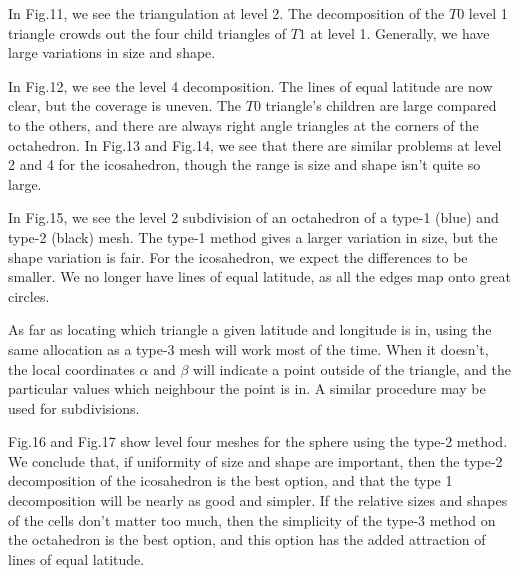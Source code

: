 \documentclass[12pt]{article}
\begin{document}
 In Fig.11, we see the triangulation
at level 2. The decomposition of the $T0$ level 1 triangle crowds out
the four child triangles of $T1$ at level 1. Generally, we have
large variations in size and shape.

In Fig.12, we see the level 4 decomposition. The lines of equal latitude
are now clear, but the coverage is uneven. The $T0$ triangle's children 
are large compared to the others, and there are always right angle triangles
at the corners of the octahedron.
In Fig.13 and Fig.14, we see that there are similar problems at level 2 and
4 for the icosahedron, though the range is size and shape isn't quite so large.

In Fig.15, we see the level 2 subdivision of an octahedron of a type-1 (blue)
and type-2 (black) mesh. The type-1 method gives a larger variation in
size, but the shape variation is fair. For the icosahedron, we expect the 
differences to be smaller. We no longer have lines of equal latitude, as all
the edges map onto great circles.

As far as locating which triangle a given latitude and longitude is in, 
 using the same allocation as a type-3 mesh will work most of the time.
When it doesn't, the local coordinates $\alpha$ and $\beta$ will indicate
a point outside of the triangle, and the particular values which neighbour
 the point is in. A similar procedure may be used for subdivisions.

Fig.16 and Fig.17 show level four meshes for the sphere using the type-2
method. We conclude that, if uniformity of size and shape are important, then
the type-2 decomposition of the icosahedron is the best option, and that
the type 1 decomposition will be nearly as good and simpler. If the
relative sizes and shapes of the cells don't matter too much, then
the simplicity of the type-3 method on the octahedron is the best option, and
 this option has the added attraction of lines of equal latitude.
\end{document}
